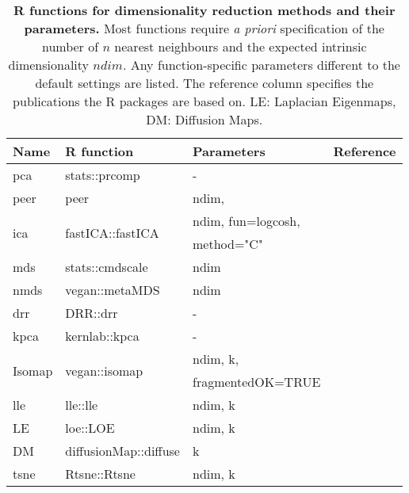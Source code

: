 \begin{table}[htbp]
  \centering
  \caption[\textbf{R functions for dimensionality reduction methods and their parameters.}]{\textbf{R functions for dimensionality reduction methods and their parameters.} Most functions require \textit{a priori} specification of the number of \(n\) nearest neighbours and the expected intrinsic dimensionality \(ndim\). Any function-specific parameters different to the default settings are listed. The reference column specifies the publications the R packages are based on. LE: Laplacian Eigenmaps, DM: Diffusion Maps.}
  \begin{small}
    \begin{tabular}{lllr}
    \toprule
    Name  & R function & Parameters & Reference \\
    \midrule
    \gls{pca}   & stats::prcomp &  -    & \citep{Hotelling1933} \\
    \gls{peer} & peer  & ndim,  & \citep{Stegle2010} \\
    \multirow{2}[0]{*}{\gls{ica}} & \multirow{2}[0]{*}{fastICA::fastICA} & ndim, fun=logcosh, & \multirow{2}[0]{*}{\citep{Hyvarinen2000}} \\
          &       &  method="C" &  \\
    \gls{mds}   & stats::cmdscale & ndim  & \citep{Gower1966} \\
    \gls{nmds}  & vegan::metaMDS & ndim  & \citep{Ripley1996} \\
    \gls{drr}   & DRR::drr &  -    & \citep{Laparra2015} \\
    \gls{kpca}  & kernlab::kpca &  -    & \citep{Schoelkopf1998} \\
    \multirow{2}[0]{*}{Isomap} & \multirow{2}[0]{*}{vegan::isomap} & ndim, k, & \multirow{2}[0]{*}{\citep{Tenenbaum2000}} \\
          &       & fragmentedOK=TRUE &  \\
    \gls{lle}   & lle::lle & ndim, k & \citep{deRidder2002} \\
    LE & loe::LOE & ndim, k & \citep{Belkin2003} \\
    DM & diffusionMap::diffuse & k     & \citep{Lafon2006} \\
    \gls{tsne}  & Rtsne::Rtsne & ndim, k & \citep{Maaten2008} \\
    \bottomrule
    \end{tabular}%
 \end{small}
 \label{tab:dimRed-R}%
\end{table}%
%


